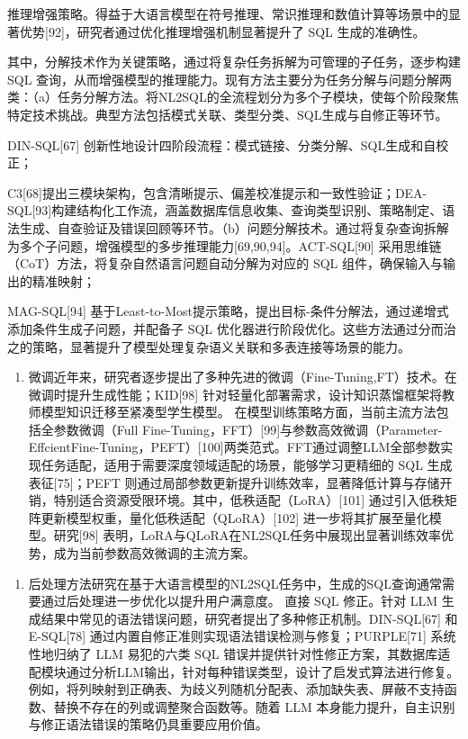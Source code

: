 \documentclass[12pt,a4paper,openright,UTF8]{ctexbook}
\begin{document}
推理增强策略。得益于大语言模型在符号推理、常识推理和数值计算等场景中的显著优势[92]，研究者通过优化推理增强机制显著提升了 SQL 生成的准确性。


其中，分解技术作为关键策略，通过将复杂任务拆解为可管理的子任务，逐步构建 SQL 查询，从而增强模型的推理能力。现有方法主要分为任务分解与问题分解两类：（a）任务分解方法。将NL2SQL的全流程划分为多个子模块，使每个阶段聚焦特定技术挑战。典型方法包括模式关联、类型分类、SQL生成与自修正等环节。


DIN-SQL[67] 创新性地设计四阶段流程：模式链接、分类分解、SQL生成和自校正；


C3[68]提出三模块架构，包含清晰提示、偏差校准提示和一致性验证；DEA-SQL[93]构建结构化工作流，涵盖数据库信息收集、查询类型识别、策略制定、语法生成、自查验证及错误回顾等环节。（b）问题分解技术。通过将复杂查询拆解为多个子问题，增强模型的多步推理能力[69,90,94]。ACT-SQL[90] 采用思维链（CoT）方法，将复杂自然语言问题自动分解为对应的 SQL 组件，确保输入与输出的精准映射；


MAG-SQL[94] 基于Least-to-Most提示策略，提出目标-条件分解法，通过递增式添加条件生成子问题，并配备子 SQL 优化器进行阶段优化。这些方法通过分而治之的策略，显著提升了模型处理复杂语义关联和多表连接等场景的能力。

\begin{enumerate}[label=(\arabic*)]
\item 微调近年来，研究者逐步提出了多种先进的微调（Fine-Tuning,FT）技术。在微调时提升生成性能；KID[98] 针对轻量化部署需求，设计知识蒸馏框架将教师模型知识迁移至紧凑型学生模型。 在模型训练策略方面，当前主流方法包括全参数微调（Full Fine-Tuning，FFT）[99]与参数高效微调（Parameter-EffcientFine-Tuning，PEFT）[100]两类范式。FFT通过调整LLM全部参数实现任务适配，适用于需要深度领域适配的场景，能够学习更精细的 SQL 生成表征[75]；PEFT 则通过局部参数更新提升训练效率，显著降低计算与存储开销，特别适合资源受限环境。其中，低秩适配（LoRA）[101] 通过引入低秩矩阵更新模型权重，量化低秩适配（QLoRA）[102] 进一步将其扩展至量化模型。研究[98] 表明，LoRA与QLoRA在NL2SQL任务中展现出显著训练效率优势，成为当前参数高效微调的主流方案。
\end{enumerate}

\begin{enumerate}[label=(\arabic*)]
\item 后处理方法研究在基于大语言模型的NL2SQL任务中，生成的SQL查询通常需要通过后处理进一步优化以提升用户满意度。 直接 SQL 修正。针对 LLM 生成结果中常见的语法错误问题，研究者提出了多种修正机制。DIN-SQL[67] 和 E-SQL[78] 通过内置自修正准则实现语法错误检测与修复；PURPLE[71] 系统性地归纳了 LLM 易犯的六类 SQL 错误并提供针对性修正方案，其数据库适配模块通过分析LLM输出，针对每种错误类型，设计了启发式算法进行修复。例如，将列映射到正确表、为歧义列随机分配表、添加缺失表、屏蔽不支持函数、替换不存在的列或调整聚合函数等。随着 LLM 本身能力提升，自主识别与修正语法错误的策略仍具重要应用价值。
\end{enumerate}
\end{document}
